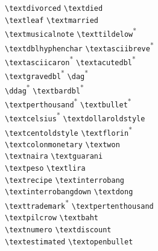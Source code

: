 {\begin{tabbing}
\textdivorced \> \lstinline+\textdivorced+ \> \textdied \> \lstinline+\textdied+\\
\textleaf \> \lstinline+\textleaf+ \> \textmarried \> \lstinline+\textmarried+\\
\textmusicalnote \> \lstinline+\textmusicalnote+ \> \texttildelow \> \lstinline+\texttildelow+\textsuperscript{*} \\
\textdblhyphenchar \> \lstinline+\textdblhyphenchar+ \> \textasciibreve \> \lstinline+\textasciibreve+\textsuperscript{*} \\
\textasciicaron \> \lstinline+\textasciicaron+\textsuperscript{*}  \> \textacutedbl \> \lstinline+\textacutedbl+\textsuperscript{*} \\
\textgravedbl \> \lstinline+\textgravedbl+\textsuperscript{*}  \> \textdagger \> \lstinline+\dag+\textsuperscript{*} \\
\textdaggerdbl \> \lstinline+\ddag+\textsuperscript{*} \> \textbardbl \> \lstinline+\textbardbl+\textsuperscript{*} \\
\textperthousand \> \lstinline+\textperthousand+\textsuperscript{*} \> \textbullet \> \lstinline+\textbullet+\textsuperscript{*} \\
\textcelsius \> \lstinline+\textcelsius+\textsuperscript{*}  \> \textdollaroldstyle \> \lstinline+\textdollaroldstyle+\\
\textcentoldstyle \> \lstinline+\textcentoldstyle+ \> \textflorin \> \lstinline+\textflorin+\textsuperscript{*} \\
\textcolonmonetary \> \lstinline+\textcolonmonetary+ \> \textwon \> \lstinline+\textwon+\\
\textnaira \> \lstinline+\textnaira+ \> \textguarani \> \lstinline+\textguarani+\\
\textpeso \> \lstinline+\textpeso+ \> \textlira \> \lstinline+\textlira+\\
\textrecipe \> \lstinline+\textrecipe+ \> \textinterrobang \> \lstinline+\textinterrobang+\\
\textinterrobangdown \> \lstinline+\textinterrobangdown+ \> \textdong \> \lstinline+\textdong+\\
\texttrademark \> \lstinline+\texttrademark+\textsuperscript{*} \> \textpertenthousand \> \lstinline+\textpertenthousand+\\
\textpilcrow \> \lstinline+\textpilcrow+ \> \textbaht \> \lstinline+\textbaht+\\
\textnumero \> \lstinline+\textnumero+ \> \textdiscount \> \lstinline+\textdiscount+\\
\textestimated \> \lstinline+\textestimated+ \> \textopenbullet \> \lstinline+\textopenbullet+\\

\end{tabbing}}
